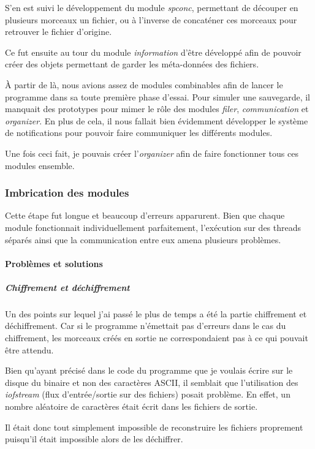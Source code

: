 \documentclass[a4paper,10pt, twoside]{report}
\begin{document}
\begin{spacing}{1.2}
S'en est suivi le développement du module \textit{spconc}, permettant de
découper en plusieurs morceaux un fichier, ou à l'inverse de concaténer ces
morceaux pour retrouver le fichier d'origine.

Ce fut ensuite au tour du module \textit{information} d'être développé afin de
pouvoir créer des objets permettant de garder les méta-données des fichiers.

À partir de là, nous avions assez de modules combinables afin de lancer le
programme dans sa toute première phase d'essai. Pour simuler une sauvegarde,
il manquait des prototypes pour mimer le rôle des modules \textit{filer},
\textit{communication} et \textit{organizer}. En plus de cela, il nous fallait
bien évidemment développer le système de notifications pour pouvoir faire
communiquer les différents modules.

Une fois ceci fait, je pouvais créer l'\textit{organizer} afin de faire
fonctionner tous ces modules ensemble.

\subsubsection{Imbrication des modules}

Cette étape fut longue et beaucoup d'erreurs apparurent. Bien que chaque module
fonctionnait individuellement parfaitement, l'exécution sur des threads séparés
ainsi que la communication entre eux amena plusieurs problèmes.

\paragraph{Problèmes et solutions}

\subparagraph{Chiffrement et déchiffrement}

\bigskip

Un des points sur lequel j'ai passé le plus de temps a été la partie
chiffrement et déchiffrement. Car si le programme n'émettait pas d'erreurs
dans le cas du chiffrement, les morceaux créés en sortie ne correspondaient
pas à ce qui pouvait être attendu.

Bien qu'ayant précisé dans le code du programme que je voulais écrire sur le
disque du binaire et non des caractères ASCII, il semblait que l'utilisation
des \textit{iofstream} (flux d'entrée/sortie sur des fichiers) posait problème.
En effet, un nombre aléatoire de caractères était écrit dans les fichiers de
sortie. 

Il était donc tout simplement impossible de reconstruire les fichiers proprement
puisqu'il était impossible alors de les déchiffrer.


\end{spacing}
\end{document}
